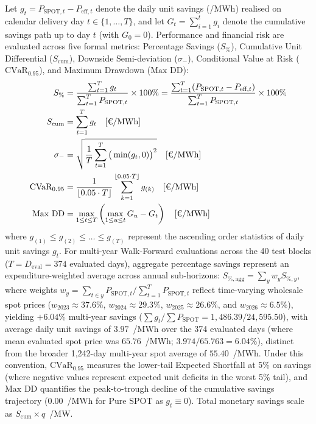 Let $g_t = P_{\text{SPOT}, t} - P_{\text{eff}, t}$ denote the daily unit savings (\texteuro/MWh) realised on calendar delivery day $t \in \{1, \dots, T\}$, and let $G_t = \sum_{i=1}^t g_i$ denote the cumulative savings path up to day $t$ (with $G_0 = 0$). Performance and financial risk are evaluated across five formal metrics: Percentage Savings ($S_{\%}$), Cumulative Unit Differential ($S_{\text{cum}}$), Downside Semi-deviation ($\sigma_-$), Conditional Value at Risk ($\text{CVaR}_{0.95}$), and Maximum Drawdown ($\text{Max DD}$):
\begin{align}
    S_{\%} &= \frac{\sum_{t=1}^T g_t}{\sum_{t=1}^T P_{\text{SPOT}, t}} \times 100\% = \frac{\sum_{t=1}^T (P_{\text{SPOT}, t} - P_{\text{eff}, t})}{\sum_{t=1}^T P_{\text{SPOT}, t}} \times 100\% \label{eq:metric_savings_pct} \\
    S_{\text{cum}} &= \sum_{t=1}^T g_t \quad [\text{\texteuro/MWh}] \label{eq:metric_savings_cum} \\
    \sigma_- &= \sqrt{\frac{1}{T} \sum_{t=1}^T \big(\min(g_t, 0)\big)^2} \quad [\text{\texteuro/MWh}] \label{eq:metric_semidev} \\
    \text{CVaR}_{0.95} &= \frac{1}{\lfloor 0.05 \cdot T \rfloor} \sum_{k=1}^{\lfloor 0.05 \cdot T \rfloor} g_{(k)} \quad [\text{\texteuro/MWh}] \label{eq:metric_cvar} \\
    \text{Max DD} &= \max_{1 \le t \le T} \left( \max_{1 \le u \le t} G_u - G_t \right) \quad [\text{\texteuro/MWh}] \label{eq:metric_maxdd}
\end{align}
where $g_{(1)} \le g_{(2)} \le \dots \le g_{(T)}$ represent the ascending order statistics of daily unit savings $g_t$. For multi-year Walk-Forward evaluations across the 40 test blocks ($T = D_{\text{eval}} = 374$ evaluated days), aggregate percentage savings represent an expenditure-weighted average across annual sub-horizons: $S_{\%, \text{agg}} = \sum_y w_y S_{\%, y}$, where weights $w_y = \sum_{t \in y} P_{\text{SPOT}, t} / \sum_{t=1}^T P_{\text{SPOT}, t}$ reflect time-varying wholesale spot prices ($w_{2023} \approx 37.6\%$, $w_{2024} \approx 29.3\%$, $w_{2025} \approx 26.6\%$, and $w_{2026} \approx 6.5\%$), yielding $+6.04\%$ multi-year savings ($\sum g_t / \sum P_{\text{SPOT}} = 1{,}486.39 / 24{,}595.50$), with average daily unit savings of $3.97$~\texteuro/MWh over the 374 evaluated days (where mean evaluated spot price was $65.76$~\texteuro/MWh; $3.974 / 65.763 = 6.04\%$), distinct from the broader 1,242-day multi-year spot average of $55.40$~\texteuro/MWh. Under this convention, $\text{CVaR}_{0.95}$ measures the lower-tail Expected Shortfall at 5\% on savings (where negative values represent expected unit deficits in the worst 5\% tail), and $\text{Max DD}$ quantifies the peak-to-trough decline of the cumulative savings trajectory ($0.00$~\texteuro/MWh for Pure SPOT as $g_t \equiv 0$). Total monetary savings scale as $S_{\text{cum}} \times q$~\texteuro/MW.

